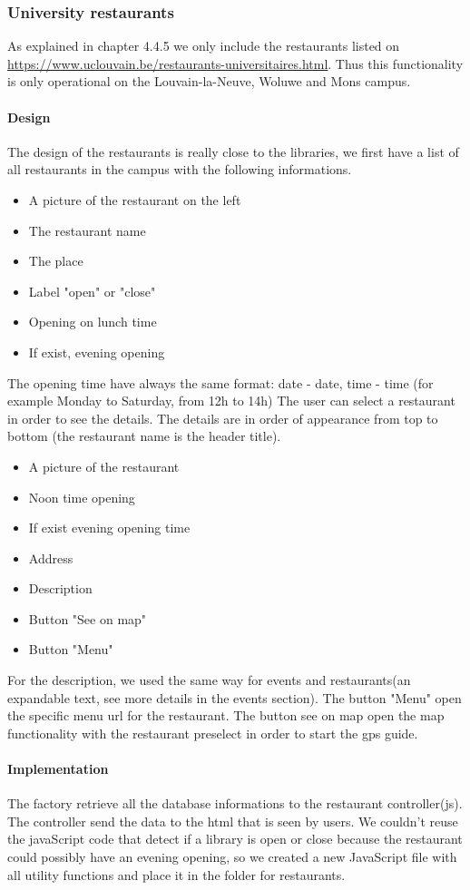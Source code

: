 \documentclass[11pt, a4paper]{report}
\begin{document}
\subsubsection{University restaurants}
As explained in chapter 4.4.5 we only include the restaurants listed on \url{https://www.uclouvain.be/restaurants-universitaires.html}. Thus this functionality is only operational on the Louvain-la-Neuve, Woluwe and Mons campus.
\paragraph{Design}
The design of the restaurants is really close to the libraries, we first have a list of all restaurants in the campus with the following informations.
\begin{itemize}
\item A picture of the restaurant on the left
\item The restaurant name
\item The place
\item Label "open" or "close"
\item Opening on lunch time
\item If exist, evening opening
\end{itemize}
The opening time have always the same format: date - date, time - time (for example Monday to Saturday, from 12h to 14h)
The user can select a restaurant in order to see the details. The details are in order of appearance from top to bottom (the restaurant name is the header title). 
\begin{itemize}
\item A picture of the restaurant
\item Noon time opening 
\item If exist evening opening time 
\item Address
\item Description
\item Button "See on map"
\item Button "Menu"
\end{itemize}
For the description, we used the same way for events and restaurants(an expandable text, see more details in the events section). The button "Menu" open the specific menu url for the restaurant. The button see on map open the map functionality with the restaurant preselect in order to start the gps guide.
\paragraph{Implementation}
The factory retrieve all the database informations to the restaurant controller(js). The controller send the data to the html that is seen by users. We couldn't reuse the javaScript code that detect if a library is open or close because the restaurant could possibly have an evening opening, so we created a new JavaScript file with all utility functions and place it in the folder for restaurants. 
\end{document}
